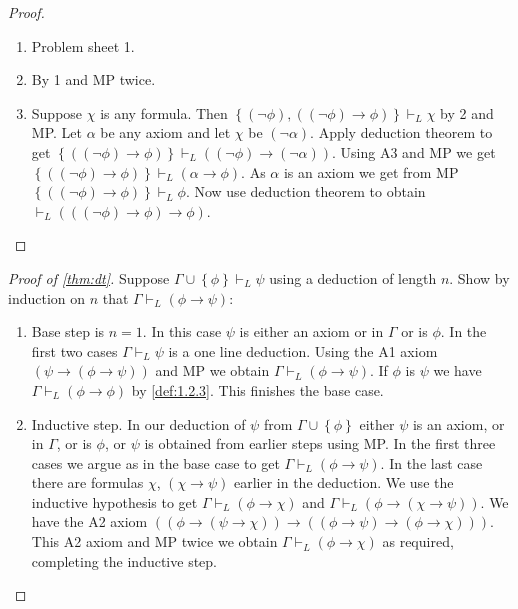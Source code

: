 \documentclass{article}
\newcommand{\rb}[1]{\left( #1 \right)}
\newcommand{\cb}[1]{\left\{ #1 \right\}}
\newcommand{\notb}[1]{\rb{\neg #1}}
\newcommand{\impb}[2]{\rb{#1 \rightarrow #2}}
\theoremstyle{definition}\newtheorem{definition}{Definition}[subsection]
\theoremstyle{definition}\newtheorem{remark}[definition]{Remark}
\theoremstyle{definition}\newtheorem*{example}{Example}
\theoremstyle{definition}\newtheorem*{note}{Note}
\begin{document}
\begin{proof}
\hfill
\begin{enumerate}
\item Problem sheet 1.
\item By 1 and MP twice.
\item Suppose $ \chi $ is any formula. Then $ \cb{\notb{\phi}, \impb{\notb{\phi}}{\phi}} \vdash_L \chi $ by 2 and MP. Let $ \alpha $ be any axiom and let $ \chi $ be $ \notb{\alpha} $. Apply deduction theorem to get $ \cb{\impb{\notb{\phi}}{\phi}} \vdash_L \impb{\notb{\phi}}{\notb{\alpha}} $. Using A3 and MP we get $ \cb{\impb{\notb{\phi}}{\phi}} \vdash_L \impb{\alpha}{\phi} $. As $ \alpha $ is an axiom we get from MP $ \cb{\impb{\notb{\phi}}{\phi}} \vdash_L \phi $. Now use deduction theorem to obtain $ \vdash_L \impb{\impb{\notb{\phi}}{\phi}}{\phi} $.
\end{enumerate}
\end{proof}

\begin{proof}[Proof of \ref{thm:dt}]
Suppose $ \Gamma \cup \cb{\phi} \vdash_L \psi $ using a deduction of length $ n $. Show by induction on $ n $ that $ \Gamma \vdash_L \impb{\phi}{\psi} $:
\begin{enumerate}
\item Base step is $ n = 1 $. In this case $ \psi $ is either an axiom or in $ \Gamma $ or is $ \phi $. In the first two cases $ \Gamma \vdash_L \psi $ is a one line deduction. Using the A1 axiom $ \impb{\psi}{\impb{\phi}{\psi}} $ and MP we obtain $ \Gamma \vdash_L \impb{\phi}{\psi} $. If $ \phi $ is $ \psi $ we have $ \Gamma \vdash_L \impb{\phi}{\phi} $ by \ref{def:1.2.3}. This finishes the base case.
\item Inductive step. In our deduction of $ \psi $ from $ \Gamma \cup \cb{\phi} $ either $ \psi $ is an axiom, or in $ \Gamma $, or is $ \phi $, or $ \psi $ is obtained from earlier steps using MP. In the first three cases we argue as in the base case to get $ \Gamma \vdash_L \impb{\phi}{\psi} $. In the last case there are formulas $ \chi $, $ \impb{\chi}{\psi} $ earlier in the deduction. We use the inductive hypothesis to get $ \Gamma \vdash_L \impb{\phi}{\chi} $ and $ \Gamma \vdash_L \impb{\phi}{\impb{\chi}{\psi}} $. We have the A2 axiom $ \impb{\impb{\phi}{\impb{\psi}{\chi}}}{\impb{\impb{\phi}{\psi}}{\impb{\phi}{\chi}}} $. This A2 axiom and MP twice we obtain $ \Gamma \vdash_L \impb{\phi}{\chi} $ as required, completing the inductive step.
\end{enumerate}
\end{proof}
\end{document}
